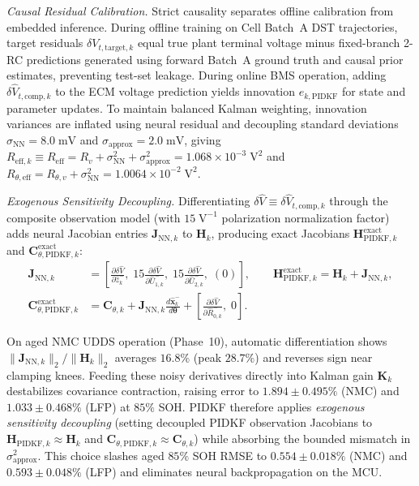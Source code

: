 \documentclass[10pt,a4paper]{article}
\begin{document}
\emph{Causal Residual Calibration.} Strict causality separates offline calibration from embedded inference. During offline training on Cell Batch~A DST trajectories, target residuals $\delta V_{t,\text{target},k}$ equal true plant terminal voltage minus fixed-branch 2-RC predictions generated using forward Batch~A ground truth and causal prior estimates, preventing test-set leakage. During online BMS operation, adding $\delta\hat{V}_{t,\text{comp},k}$ to the ECM voltage prediction yields innovation $e_{k,\text{PIDKF}}$ for state and parameter updates. To maintain balanced Kalman weighting, innovation variances are inflated using neural residual and decoupling standard deviations $\sigma_{\text{NN}} = 8.0\;\mathrm{mV}$ and $\sigma_{\text{approx}} = 2.0\;\mathrm{mV}$, giving $R_{\text{eff},k} \equiv R_{\text{eff}} = R_v + \sigma_{\text{NN}}^2 + \sigma_{\text{approx}}^2 = 1.068 \times 10^{-3}\;\mathrm{V}^2$ and $R_{\theta,\text{eff}} = R_{\theta,v} + \sigma_{\text{NN}}^2 = 1.0064 \times 10^{-2}\;\mathrm{V}^2$.

\emph{Exogenous Sensitivity Decoupling.} Differentiating $\delta\hat{V} \equiv \delta\hat{V}_{t,\text{comp},k}$ through the composite observation model (with $15\;\mathrm{V}^{-1}$ polarization normalization factor) adds neural Jacobian entries $\mathbf{J}_{\text{NN},k}$ to $\mathbf{H}_k$, producing exact Jacobians $\mathbf{H}_{\text{PIDKF},k}^{\text{exact}}$ and $\mathbf{C}_{\theta,\text{PIDKF},k}^{\text{exact}}$:
\begin{align*}
\mathbf{J}_{\text{NN},k} &= \left[\frac{\partial\delta\hat{V}}{\partial\hat{z}_k^-},\; 15\frac{\partial\delta\hat{V}}{\partial\hat{U}_{1,k}^-},\; 15\frac{\partial\delta\hat{V}}{\partial\hat{U}_{2,k}^-},\; (0)\right], \qquad
\mathbf{H}_{\text{PIDKF},k}^{\text{exact}} = \mathbf{H}_k + \mathbf{J}_{\text{NN},k}, \\
\mathbf{C}_{\theta,\text{PIDKF},k}^{\text{exact}} &= \mathbf{C}_{\theta,k} + \mathbf{J}_{\text{NN},k}\frac{d\hat{\mathbf{x}}_k^-}{d\boldsymbol{\theta}} + \left[\frac{\partial \delta\hat{V}}{\partial \hat{R}_{0,k}^-},\; 0\right].
\end{align*}
{\sloppy On aged NMC UDDS operation (Phase~10), automatic differentiation shows $\|\mathbf{J}_{\text{NN},k}\|_2 / \|\mathbf{H}_k\|_2$ averages $16.8\%$ (peak $28.7\%$) and reverses sign near clamping knees. Feeding these noisy derivatives directly into Kalman gain $\mathbf{K}_k$ destabilizes covariance contraction, raising error to $1.894\pm0.495\%$ (NMC) and $1.033\pm0.468\%$ (LFP) at $85\%$ SOH. PIDKF therefore applies \emph{exogenous sensitivity decoupling} (setting decoupled PIDKF observation Jacobians to $\mathbf{H}_{\text{PIDKF},k} \approx \mathbf{H}_k$ and $\mathbf{C}_{\theta,\text{PIDKF},k} \approx \mathbf{C}_{\theta,k}$) while absorbing the bounded mismatch in $\sigma_{\text{approx}}^2$. This choice slashes aged $85\%$ SOH RMSE to $0.554\pm0.018\%$ (NMC) and $0.593\pm0.048\%$ (LFP) and eliminates neural backpropagation on the MCU.\par}
\end{document}
